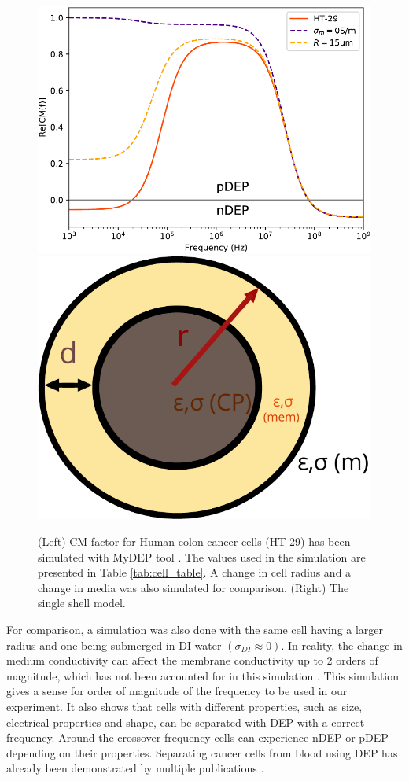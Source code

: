 \documentclass[final]{jyflluk}
\begin{document}
\begin{figure}[h]%
    \centering
    \includegraphics[width=.70\linewidth]{images/plot_DEP2.pdf}\quad\includegraphics[width=.27\linewidth]{images/single_shell.pdf}
    \qquad
    \begin{minipage}{1.2in}
    \end{minipage}%
    \caption{(Left) CM factor for Human colon cancer cells (HT-29) has been simulated with MyDEP tool \cite{cottet_mydep_2019}. The values used in the simulation are presented in Table \ref{tab:cell_table}. A change in cell radius and a change in media was also simulated for comparison. (Right) The single shell model.}%
    \label{fig:single_shell}%
\end{figure}


For comparison, a simulation was also done with the same cell having a larger radius and one being submerged in DI-water $(\sigma_{DI}\approx0)$. In reality, the change in medium conductivity can affect the membrane conductivity up to 2 orders of magnitude, which has not been accounted for in this simulation \cite{wu_dielectrophoretic_2012}. This simulation gives a sense for order of magnitude of the frequency to be used in our experiment. It also shows that cells with different properties, such as size, electrical properties and shape, can be separated with DEP with a correct frequency. Around the crossover frequency cells can experience nDEP or pDEP depending on their properties. Separating cancer cells from blood using DEP has already been demonstrated by multiple publications \cite{becker_separation_1995,huang_enrichment_2013,kang_continuous_2006, ivory_direct_2011}.
\end{document}
